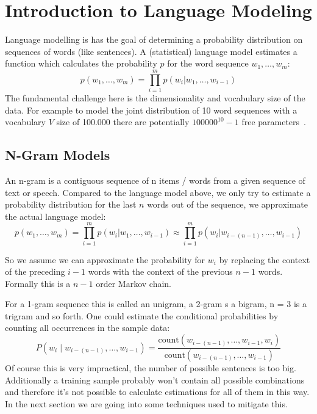 
\section{Introduction to Language Modeling}
\label{sec:language-modeling}

Language modelling is has the goal of determining a probability distribution on sequences of words (like sentences).
A (statistical) language model estimates a function which calculates the probability $p$ for the word sequence $w_1,\dots,w_m$:
\[
    p(w_1,\dots,w_m) = \prod_{i=1}^{m} p(w_i | w_1,\dots,w_{i-1})
\]
The fundamental challenge here is the dimensionality and vocabulary size of the data. For example to model the joint distribution
of 10 word sequences with a vocabulary $V$ size of 100.000 there are potentially $100000^{10} - 1$ 
free parameters~\cite{Bengio:2003:NPL:944919.944966}. 

\subsection{N-Gram Models}
\label{subsec:n-gram}

An n-gram is a contiguous sequence of n items / words from a given sequence of text or speech. Compared to the language model above,
we only try to estimate a probability distribution for the last $n$ words out of the sequence, we approximate the actual language model:
\[
p(w_1,\dots,w_m) = \prod_{i=1}^{m} p(w_i | w_1,\dots,w_{i-1}) \approx \prod_{i=1}^{m} p(w_i | w_{i-(n-1)},\dots,w_{i-1})
\]

So we assume we can approximate the probability for $w_i$ by replacing the context of the preceding $i - 1$ words with 
the context of the previous $n - 1$ words. Formally this is a $n - 1$ order Markov chain. %

For a 1-gram sequence this is called an unigram, a 2-gram s a bigram, n = 3 is a trigram and so forth.
One could estimate the conditional probabilities by counting all occurrences in the sample data:
\[
P(w_i\mid w_{i-(n-1)},\ldots,w_{i-1}) = \frac{\mathrm{count}(w_{i-(n-1)},\ldots,w_{i-1},w_i)}{\mathrm{count}(w_{i-(n-1)},\ldots,w_{i-1})}
\]
Of course this is very impractical, the number of possible sentences is too big. Additionally a training sample probably 
won't contain all possible combinations and therefore it's not possible to calculate estimations for all of them in this way.
In the next section we are going into some techniques used to mitigate this.


